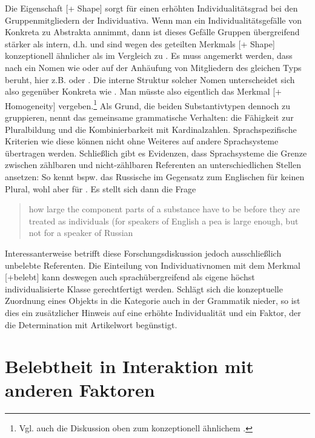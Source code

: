 Die Eigenschaft [+ Shape] sorgt für einen erhöhten Individualitätsgrad bei den Gruppenmitgliedern der Individuativa. Wenn man ein Individualitätsgefälle von Konkreta zu Abstrakta annimmt, dann ist dieses Gefälle Gruppen übergreifend stärker als intern, d.h.  und  sind wegen des geteilten Merkmals [+ Shape] konzeptionell ähnlicher als  im Vergleich zu  . Es muss angemerkt werden, dass nach \textcite{Rijkhoff2002} ein Nomen wie  oder  auf der Anhäufung von Mitgliedern des gleichen Typs beruht, hier z.B.  oder . Die interne Struktur solcher Nomen unterscheidet sich also gegenüber  Konkreta wie . Man müsste also eigentlich das Merkmal [+ Homogeneity] vergeben.\footnote{Vgl. auch die Diskussion oben zum konzeptionell ähnlichem .} Als Grund, die beiden Substantivtypen dennoch zu gruppieren, nennt \textcite[103]{Zifonun2012}  das gemeinsame grammatische Verhalten: die Fähigkeit zur Pluralbildung und die Kombinierbarkeit mit Kardinalzahlen. Sprachspezifische Kriterien wie diese können nicht ohne Weiteres auf andere Sprachsysteme übertragen werden. Schließlich gibt es Evidenzen, dass Sprachsysteme die Grenze zwischen zählbaren und nicht-zählbaren Referenten an unterschiedlichen Stellen ansetzen: So kennt bspw. das Russische im Gegensatz zum Englischen für  keinen Plural, wohl aber für  \parencite[80]{Corbett2000}. Es stellt sich dann die Frage \blockcquote[80]{Corbett2000}{how large the component parts of a substance have to be before they are treated as individuals (for speakers of English a pea is large enough, but not for a speaker of Russian}. Interessanterweise betrifft diese Forschungsdiskussion jedoch ausschließlich unbelebte Referenten. Die Einteilung von Individuativnomen mit dem Merkmal [+belebt] kann deswegen auch sprachübergreifend als eigene höchst individualisierte Klasse gerechtfertigt werden. Schlägt sich die konzeptuelle Zuordnung eines Objekts in die Kategorie  auch in der Grammatik nieder, so ist dies ein zusätzlicher Hinweis auf eine erhöhte Individualität und ein Faktor, der die Determination mit Artikelwort begünstigt. 

\section{Belebtheit in Interaktion mit anderen Faktoren} \label{sec:andere-kog}
 
